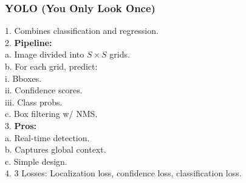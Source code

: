\subsubsection{YOLO (You Only Look Once)}
1. Combines classification and regression. \\
2. \textbf{Pipeline:} \\
   a. Image divided into $S \times S$ grids. \\
   b. For each grid, predict: \\
      i. Bboxes. \\
      ii. Confidence scores. \\
      iii. Class probs. \\
   c. Box filtering w/ NMS. \\
3. \textbf{Pros:} \\
   a. Real-time detection. \\
   b. Captures global context. \\
   c. Simple design. \\
4. 3 Losses: Localization loss, confidence loss, classification loss. \\
